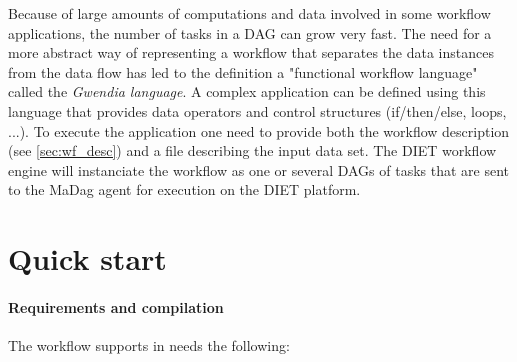 Because of large amounts of computations and data involved in some workflow
applications, the number of tasks in a DAG can grow very fast. The need for a
more abstract way of representing a workflow that separates the data instances from
the data flow has led to the definition a "functional workflow language" called the
\textit{Gwendia language}. A complex application can be defined using this language that
provides data operators and control structures (if/then/else, loops, ...). To
execute the application one need to provide both the workflow description (see
\ref{sec:wf_desc}) and a file describing the input data set. The DIET workflow
engine will instanciate the workflow as one or several DAGs of tasks that are
sent to the MaDag agent for execution on the DIET platform.

\section{Quick start}

\paragraph{Requirements and compilation}

The workflow supports in \diet needs the following:


